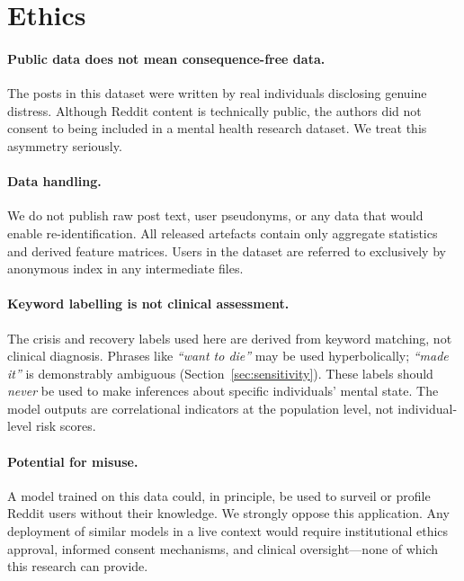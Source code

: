 \documentclass[11pt]{article}
\begin{document}
\section{Ethics}
\label{sec:ethics}

\paragraph{Public data does not mean consequence-free data.}
The posts in this dataset were written by real individuals disclosing
genuine distress. Although Reddit content is technically public, the
authors did not consent to being included in a mental health research
dataset. We treat this asymmetry seriously.

\paragraph{Data handling.}
We do not publish raw post text, user pseudonyms, or any data that
would enable re-identification.
All released artefacts contain only aggregate statistics and derived
feature matrices.
Users in the dataset are referred to exclusively by anonymous index in any
intermediate files.

\paragraph{Keyword labelling is not clinical assessment.}
The crisis and recovery labels used here are derived from keyword
matching, not clinical diagnosis.
Phrases like \emph{``want to die''} may be used hyperbolically;
\emph{``made it''} is demonstrably ambiguous (Section~\ref{sec:sensitivity}).
These labels should \emph{never} be used to make inferences about
specific individuals' mental state.
The model outputs are correlational indicators at the population level,
not individual-level risk scores.

\paragraph{Potential for misuse.}
A model trained on this data could, in principle, be used to
surveil or profile Reddit users without their knowledge.
We strongly oppose this application.
Any deployment of similar models in a live context would require
institutional ethics approval, informed consent mechanisms, and
clinical oversight---none of which this research can provide.
\end{document}
